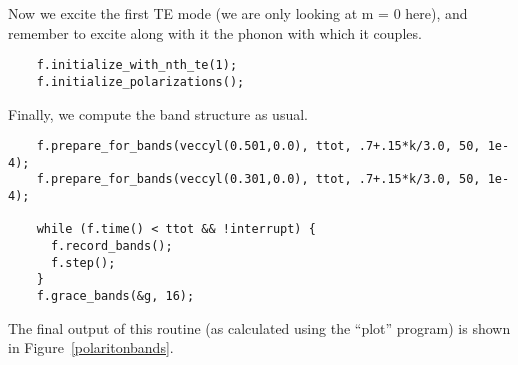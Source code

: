 Now we excite the first TE mode (we are only looking at m = 0 here), and
remember to excite along with it the phonon with which it couples.

\begin{verbatim}
    f.initialize_with_nth_te(1);
    f.initialize_polarizations();
\end{verbatim}

Finally, we compute the band structure as usual.

\begin{verbatim}
    f.prepare_for_bands(veccyl(0.501,0.0), ttot, .7+.15*k/3.0, 50, 1e-4);
    f.prepare_for_bands(veccyl(0.301,0.0), ttot, .7+.15*k/3.0, 50, 1e-4);
    
    while (f.time() < ttot && !interrupt) {
      f.record_bands();
      f.step();
    }
    f.grace_bands(&g, 16);
\end{verbatim}
\begin{comment}
  }
}
\end{comment}

The final output of this routine (as calculated using the ``plot'' program)
is shown in Figure~\ref{polaritonbands}.